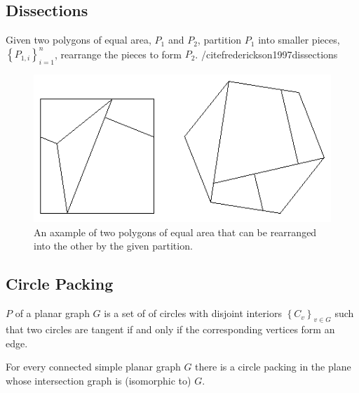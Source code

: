 \subsection{Dissections}
\begin{prob}\label{def:dissection}
Given two polygons of equal area, $P_1$ and $P_2$, partition $P_1$ into smaller
pieces,$\left\lbrace P_{1,i}\right\rbrace_{i=1}^n $, rearrange the pieces to
form $P_2$. /cite{frederickson1997dissections}
\end{prob}
\begin{figure}[h]
\begin{center}
\includegraphics[scale=1]{graphics/polygonaldissection.png}
\caption{An axample of two polygons of equal area that can be rearranged into
the other by the given partition.\cite{davidEppstienJunkyard}}
\label{fig:polygonaldissection}
\end{center}
\end{figure}
\subsection{Circle Packing}
\begin{definition}\label{def:circlePacking}
$P$ of a planar graph $G$ is a set of of circles with disjoint
interiors $\left\lbrace C_v \right\rbrace_{v \in G} $ such that two
circles are tangent if and only if the corresponding vertices form an edge.
\cite{arXiv13113363v1}
\end{definition} 


\begin{thm}\label{thm2-1}
For every connected simple planar graph $G$ there is a circle packing in the
plane whose intersection graph is (isomorphic to) $G$.
\cite{stephenson2005introduction}
\end{thm}
